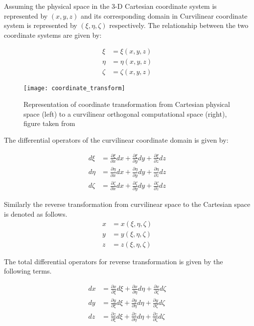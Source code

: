 Assuming the physical space in the 3-D Cartesian coordinate system is represented by $\left(x,y,z\right)$ and its corresponding domain in Curvilinear coordinate system is represented by $\left(\xi,\eta,\zeta\right)$ respectively. The relationship between the two coordinate systems are given by:

\begin{align}
 \xi &= \xi\left(x,y,z\right)\\
 \eta &= \eta\left(x,y,z\right)\\
 \zeta &= \zeta\left(x,y,z\right)
 \label{eqn:3.1}
\end{align}

\begin{figure}[h]
 \centering
 \texttt{[image: coordinate\_transform]}
 \caption{Representation of coordinate transformation from Cartesian physical space (left) to a curvilinear orthogonal computational space (right), figure taken from \citet{munsch2015entwicklung}}
 \label{fig:3.1}
\end{figure}

The differential operators of the curvilinear coordinate domain is given by:

\begin{align}
 d\xi &= \frac{\partial{\xi}}{\partial{x}}dx+\frac{\partial{\xi}}{\partial{y}}dy+\frac{\partial{\xi}}{\partial{z}}dz\\
 d\eta &= \frac{\partial{\eta}}{\partial{x}}dx+\frac{\partial{\eta}}{\partial{y}}dy+\frac{\partial{\eta}}{\partial{z}}dz\\
 d\zeta &= \frac{\partial{\zeta}}{\partial{x}}dx+\frac{\partial{\zeta}}{\partial{y}}dy+\frac{\partial{\zeta}}{\partial{z}}dz
\end{align}

Similarly the reverse transformation from curvilinear space to the Cartesian space is denoted as follows.
\begin{align}
 x &= x\left(\xi,\eta,\zeta\right)\\
 y &= y\left(\xi,\eta,\zeta\right)\\
 z &= z\left(\xi,\eta,\zeta\right)
\end{align}

The total differential operators for reverse transformation is given by the following terms.

\begin{align}
 dx &= \frac{\partial{x}}{\partial{\xi}}d\xi+\frac{\partial{x}}{\partial{\eta}}d\eta+\frac{\partial{x}}{\partial{\zeta}}d\zeta\\
 dy &= \frac{\partial{y}}{\partial{\xi}}d\xi+\frac{\partial{y}}{\partial{\eta}}d\eta+\frac{\partial{y}}{\partial{\zeta}}d\zeta\\
 dz &= \frac{\partial{z}}{\partial{\xi}}d\xi+\frac{\partial{z}}{\partial{\eta}}d\eta+\frac{\partial{z}}{\partial{\zeta}}d\zeta
\end{align}

